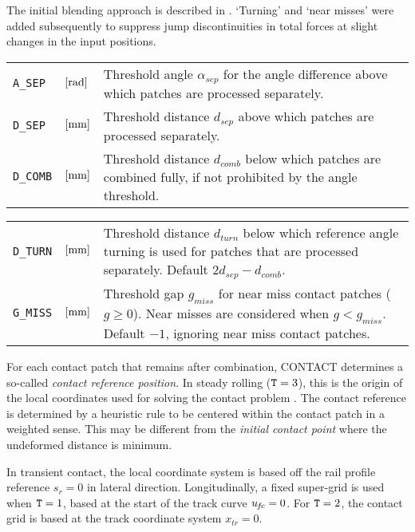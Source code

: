 \documentclass[12pt]{report}
\newenvironment{inputvars}{\vspace{0.4\baselineskip}%

\begin{tabular}{>{\raggedright}p{22mm}p{19mm}p{113mm}}}{
\end{tabular}

}
\newcommand{\inpvar}[3]{{\small\tt #1} & $#2$ & #3 \\[1ex]}
\newcommand{\inpbreak}{\end{inputvars}\begin{inputvars}}
\begin{document}
The initial blending approach is described in \cite{Vollebregt2020b-wrgeom,
Vollebregt2020c-distr-force}. `Turning' and `near misses' were added
subsequently to suppress jump discontinuities in total forces at slight
changes in the input positions.
\begin{inputvars}
\inpvar{A\_SEP}{\bunit{rad}}{Threshold angle $\alpha_{sep}$ for the angle
        difference above which patches are processed separately.}
\inpvar{D\_SEP}{\bunit{mm}}{Threshold distance $d_{sep}$ above which patches
        are processed separately.}
\inpvar{D\_COMB}{\bunit{mm}}{Threshold distance $d_{comb}$ below which
        patches are combined fully, if not prohibited by the angle threshold.}
\inpbreak
\inpvar{D\_TURN}{\bunit{mm}}{Threshold distance $d_{turn}$ below which
        reference angle turning is used for patches that are processed
        separately. Default $2 d_{sep}-d_{comb}$.}
\inpvar{G\_MISS}{\bunit{mm}}{Threshold gap $g_{miss}$ for near miss
        contact patches ($g\ge 0$). Near misses are considered when
        $g<g_{miss}$. Default $-1$, ignoring near miss contact patches.}
\end{inputvars}
For each contact patch that remains after combination, CONTACT determines a
so-called {\em contact reference position\/}. In steady rolling (${\tt
T}=3$), this is the origin of the local coordinates used for solving the
contact problem \cite{Vollebregt2020b-wrgeom}. The contact reference is
determined by a heuristic rule to be centered within the contact patch in
a weighted sense. This may be different from the {\em initial contact
point\/} where the undeformed distance is minimum. 

In transient contact, the local coordinate system is based off the rail
profile reference $s_r=0$ in lateral direction. Longitudinally, a fixed
super-grid is used when ${\tt T}=1$, based at the start of the track curve
$u_{\mkern-2muf\mkern-2muc}=0$. For ${\tt T}=2$, the contact grid is based at the track
coordinate system $x_{tr}=0$.
\end{document}
